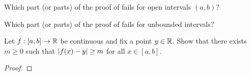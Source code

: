 \begin{problem}
  Which part (or parts) of the proof of  fails for open intervals $(a, b)$?
\end{problem}

\begin{problem}
  Which part (or parts) of the proof of  fails for unbounded intervals? 
\end{problem}

\begin{problem}
  Let $f : [a, b] \to \mathbb{R}$ be continuous and fix a point $y \in \mathbb{R}$. Show that there exists $m \geq 0$ such that
  $\left\lvert f(x) - y \right\rvert \geq m$ for all $x \in [a, b]$.

  \begin{proof}
  \end{proof}
\end{problem}
